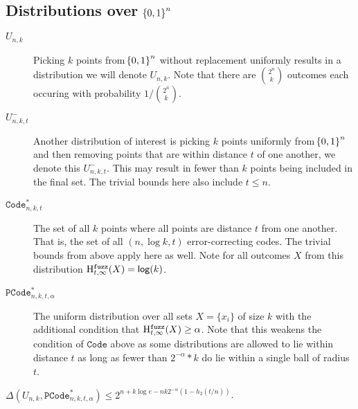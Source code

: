 \subsection{Distributions over $\!\left\{ 0,1 \right\}^{n}$}
\begin{description}
    \item[$U_{n,k}$] Picking $k$ points from $\!\left\{ 0,1 \right\}^{n}$ without replacement uniformly results in a distribution we will denote $U_{n,k}$. Note that there are ${2^{n}\choose k}$ outcomes each occuring with probability $1/{2^{n}\choose k}$.

    \item[$U_{n,k,t}^{-}$] Another distribution of interest is picking $k$ points uniformly from $\!\left\{ 0,1 \right\}^{n}$ and then removing points that are within distance $t$ of one another, we denote this $U_{n,k,t}^{-}$. 
    This may result in fewer than $k$ points being included in the final set. 
    The trivial bounds here also include $t \leq n$. 

    \item[$\mathtt{Code}_{n,k,t}^{*}$] The set of all $k$ points where all points are distance $t$ from one another.  That is, the set of all $(n,\log k, t)$ error-correcting codes. The trivial bounds from above apply here as well.  Note for all outcomes $X$ from this distribution $\mathrm{H}^{\mathtt{fuzz}}_{t,\infty}(X) = \mathsf{log}\!\left(k\right)$.
    
    \item[$\mathtt{PCode}_{n, k, t, \alpha}^{*}$] The uniform distribution over all sets $X = \{x_i\}$ of size $k$ with the additional condition that $\mathrm{H}^{\mathtt{fuzz}}_{t,\infty}(X) \ge \alpha$.  Note that this weakens the condition of $\mathtt{Code}$ above as some distributions are allowed to lie within distance $t$ as long as fewer than $2^{-\alpha}*k$ do lie within a single ball of radius $t$.
\end{description}
 
 
 \begin{lemma}
 $\Delta(U_{n,k}, \mathtt{PCode}_{n, k, t, \alpha}^{*}) \le 2^{n+k\log e- nk2^{-\alpha}(1-h_2(t/n))}$.
 \end{lemma}
 
